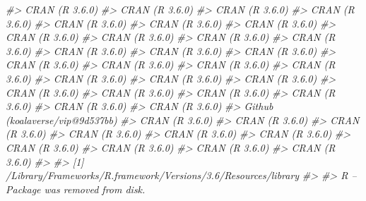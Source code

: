 \documentclass[]{krantz}
\makeatletter
\newenvironment{Shaded}{\begin{snugshade}}{\end{snugshade}}
\newcommand{\CommentTok}[1]{\textcolor[rgb]{0.37,0.37,0.37}{\textit{#1}}}
\newenvironment{kframe}{%
\medskip{}
\setlength{\fboxsep}{.8em}
 \def\at@end@of@kframe{}%
 \ifinner\ifhmode%
  \def\at@end@of@kframe{\end{minipage}}%
  \begin{minipage}{\columnwidth}%
 \fi\fi%
 \def\FrameCommand##1{\hskip\@totalleftmargin \hskip-\fboxsep
 \colorbox{shadecolor}{##1}\hskip-\fboxsep
     \hskip-\linewidth \hskip-\@totalleftmargin \hskip\columnwidth}%
 \MakeFramed {\advance\hsize-\width
   \@totalleftmargin\z@ \linewidth\hsize
   \@setminipage}}%
 {\par\unskip\endMakeFramed%
 \at@end@of@kframe}
\renewenvironment{Shaded}{\begin{kframe}}{\end{kframe}}
\makeatother
\begin{document}
\begin{Shaded}
\begin{Highlighting}[]
\CommentTok{#>  CRAN (R 3.6.0)                 }
\CommentTok{#>  CRAN (R 3.6.0)                 }
\CommentTok{#>  CRAN (R 3.6.0)                 }
\CommentTok{#>  CRAN (R 3.6.0)                 }
\CommentTok{#>  CRAN (R 3.6.0)                 }
\CommentTok{#>  CRAN (R 3.6.0)                 }
\CommentTok{#>  CRAN (R 3.6.0)                 }
\CommentTok{#>  CRAN (R 3.6.0)                 }
\CommentTok{#>  CRAN (R 3.6.0)                 }
\CommentTok{#>  CRAN (R 3.6.0)                 }
\CommentTok{#>  CRAN (R 3.6.0)                 }
\CommentTok{#>  CRAN (R 3.6.0)                 }
\CommentTok{#>  CRAN (R 3.6.0)                 }
\CommentTok{#>  CRAN (R 3.6.0)                 }
\CommentTok{#>  CRAN (R 3.6.0)                 }
\CommentTok{#>  CRAN (R 3.6.0)                 }
\CommentTok{#>  CRAN (R 3.6.0)                 }
\CommentTok{#>  CRAN (R 3.6.0)                 }
\CommentTok{#>  CRAN (R 3.6.0)                 }
\CommentTok{#>  CRAN (R 3.6.0)                 }
\CommentTok{#>  CRAN (R 3.6.0)                 }
\CommentTok{#>  CRAN (R 3.6.0)                 }
\CommentTok{#>  CRAN (R 3.6.0)                 }
\CommentTok{#>  CRAN (R 3.6.0)                 }
\CommentTok{#>  CRAN (R 3.6.0)                 }
\CommentTok{#>  CRAN (R 3.6.0)                 }
\CommentTok{#>  CRAN (R 3.6.0)                 }
\CommentTok{#>  Github (koalaverse/vip@9d537bb)}
\CommentTok{#>  CRAN (R 3.6.0)                 }
\CommentTok{#>  CRAN (R 3.6.0)                 }
\CommentTok{#>  CRAN (R 3.6.0)                 }
\CommentTok{#>  CRAN (R 3.6.0)                 }
\CommentTok{#>  CRAN (R 3.6.0)                 }
\CommentTok{#>  CRAN (R 3.6.0)                 }
\CommentTok{#>  CRAN (R 3.6.0)                 }
\CommentTok{#>  CRAN (R 3.6.0)                 }
\CommentTok{#>  CRAN (R 3.6.0)                 }
\CommentTok{#>  CRAN (R 3.6.0)                 }
\CommentTok{#> }
\CommentTok{#> [1] /Library/Frameworks/R.framework/Versions/3.6/Resources/library}
\CommentTok{#> }
\CommentTok{#>  R -- Package was removed from disk.}
\end{Highlighting}
\end{Shaded}



\backmatter
\printindex
\end{document}
